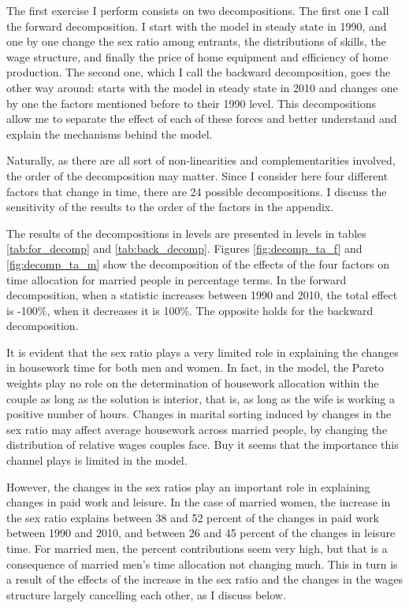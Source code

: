 \documentclass[12pt]{article}
\begin{document}
The first exercise I perform consists on two decompositions. The first one I call the forward decomposition. I start with the model in steady state in 1990, and one by one change the sex ratio among entrants, the distributions of skills, the wage structure, and finally the price of home equipment and efficiency of home production. The second one, which I call the backward decomposition, goes the other way around: starts with the model in steady state in 2010 and changes one by one the factors mentioned before to their 1990 level. This decompositions allow me to separate the effect of each of these forces and better understand and explain the mechanisms behind the model.

Naturally, as there are all sort of non-linearities and complementarities involved, the order of the decomposition may matter. Since I consider here four different factors that change in time, there are 24 possible decompositions. I discuss the sensitivity of the results to the order of the factors in the appendix.

The results of the decompositions in levels are presented in levels in tables \ref{tab:for_decomp} and \ref{tab:back_decomp}. Figures \ref{fig:decomp_ta_f} and \ref{fig:decomp_ta_m} show the decomposition of the effects of the four factors on time allocation for married people in percentage terms. In the forward decomposition, when a statistic increases between 1990 and 2010, the total effect is -100\%, when it decreases it is 100\%. The opposite holds for the backward decomposition. 

It is evident that the sex ratio plays a very limited role in explaining the changes in housework time for both men and women. In fact, in the model, the Pareto weights play no role on the determination of housework allocation within the couple as long as the solution is interior, that is, as long as the wife is working a positive number of hours. Changes in marital sorting induced by changes in the sex ratio may affect average housework across married people, by changing the distribution of relative wages couples face. Buy it seems that the importance this channel plays is limited in the model. 

However, the changes in the sex ratios play an important role in explaining changes in paid work and leisure. In the case of married women, the increase in the sex ratio explains between 38 and 52 percent of the changes in paid work between 1990 and 2010, and between 26 and 45 percent of the changes in leisure time. For married men, the percent contributions seem very high, but that is a consequence of married men's time allocation not changing much. This in turn is a result of the effects of the increase in the sex ratio and the changes in the wages structure largely cancelling each other, as I discuss below.
\end{document}
